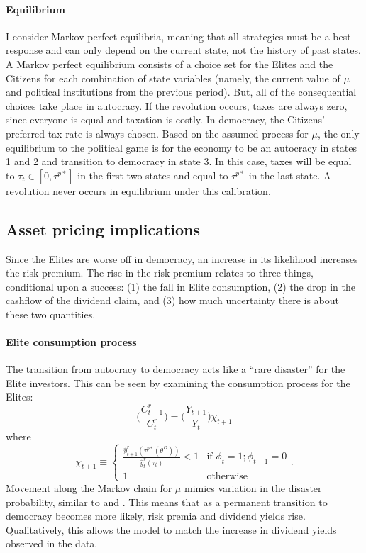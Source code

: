 \documentclass[12pt]{article}
\numberwithin{equation}{section}
\begin{document}
\paragraph{Equilibrium}
I consider Markov perfect equilibria, meaning that all strategies must be a best response and can only depend on the current state, not the history of past states. A Markov perfect equilibrium consists of a choice set for the Elites and the Citizens for each combination of state variables (namely, the current value of $\mu$ and political institutions from the previous period). But, all of the consequential choices take place in autocracy. If the revolution occurs, taxes are always zero, since everyone is equal and taxation is costly.  In democracy, the Citizens' preferred tax rate is always chosen. Based on the assumed process for $\mu$, the only equilibrium to the political game is for the economy to be an autocracy in states 1 and 2 and transition to democracy in state 3. In this case, taxes will be equal to $\tau_t \in [0,\tau^{p*}]$ in the first two states and equal to $\tau^{p*}$ in the last state. A revolution never occurs in equilibrium under this calibration.

\subsection{Asset pricing implications}

Since the Elites are worse off in democracy, an increase in its likelihood increases the risk premium. The rise in the risk premium relates to three things, conditional upon a success: (1) the fall in Elite consumption, (2) the drop in the cashflow of the dividend claim, and (3) how much uncertainty there is about these two quantities. 

\paragraph{Elite consumption process}
The transition from autocracy to democracy acts like a ``rare disaster'' for the Elite investors. This can be seen by examining the  consumption process for the Elites:
\begin{equation}\label{eq:elite_consumption}
\bigg(\frac{C_{t+1}^r}{C_{t}^r}\bigg) = \bigg(\frac{Y_{t+1}}{Y_{t}}\bigg) \chi_{t+1}
\end{equation}
where
\begin{equation}\label{eq:dem_disaster}
\chi_{t+1} \equiv \begin{cases} 
\frac{\hat{y}_{t+1}^{r}(\tau^{p*}(\theta^{D}))}{\hat{y}_{t}^{r}(\tau_{t})} < 1 & \textrm{if }\phi_{t}=1;\phi_{t-1}=0 \\
1 & \textrm{otherwise}
\end{cases}.
\end{equation}
Movement along the Markov chain for $\mu$  mimics variation in the disaster probability, similar to \cite{Gabaix2012} and \cite{Wachter2013}.  This means that as a permanent transition to democracy becomes more likely, risk premia and dividend yields rise.  Qualitatively, this allows the model to match the increase in dividend yields observed in the data. 
\end{document}
